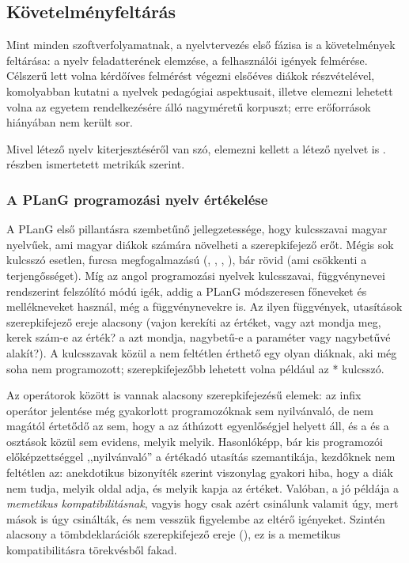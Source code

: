 
\subsection{Követelményfeltárás}

Mint minden szoftverfolyamatnak, a nyelvtervezés első fázisa is a követelmények feltárása: a nyelv feladatterének elemzése, a felhasználói igények felmérése.
Célszerű lett volna kérdőíves felmérést végezni elsőéves diákok részvételével, komolyabban kutatni a nyelvek pedagógiai aspektusait, illetve elemezni lehetett volna az egyetem rendelkezésére álló nagyméretű korpuszt; erre erőforrások hiányában nem került sor.

Mivel létező nyelv kiterjesztéséről van szó, elemezni kellett a létező nyelvet is . részben ismertetett metrikák szerint.

\subsubsection{A PLanG programozási nyelv értékelése}


A PLanG első pillantásra szembetűnő jellegzetessége, hogy kulcsszavai magyar nyelvűek, ami magyar diákok számára növelheti a szerepkifejező erőt.
Mégis sok kulcsszó esetlen, furcsa megfogalmazású (, , , ), bár rövid (ami csökkenti a terjengősséget).
Míg az angol programozási nyelvek kulcsszavai, függvénynevei rendszerint felszólító módú igék, addig a PLanG módszeresen főneveket és mellékneveket használ, még a függvénynevekre is.
Az ilyen függvények, utasítások szerepkifejező ereje alacsony (vajon  kerekíti az értéket, vagy azt mondja meg, kerek szám-e az érték? a  azt mondja, nagybetű-e a paraméter vagy nagybetűvé alakít?).
A kulcsszavak közül a  nem feltétlen érthető egy olyan diáknak, aki még soha nem programozott; szerepkifejezőbb lehetett volna például az * kulcsszó.

Az operátorok között is vannak alacsony szerepkifejezésű elemek: az  infix operátor jelentése még gyakorlott programozóknak sem nyilvánvaló, de nem magától értetődő az sem, hogy a \plang{/=} az áthúzott egyenlőségjel helyett áll, és a  és a \plang{/} osztások közül sem evidens, melyik melyik.
Hasonlóképp, bár kis programozói előképzettséggel ,,nyilvánvaló'' a \plang{:=} értékadó utasítás szemantikája, kezdőknek nem feltétlen az: anekdotikus bizonyíték szerint viszonylag gyakori hiba, hogy a diák nem tudja, melyik oldal adja, és melyik kapja az értéket.
Valóban, a \plang{:=} jó példája a \textit{memetikus kompatibilitásnak}, vagyis hogy csak azért csinálunk valamit úgy, mert mások is úgy csinálták, és nem vesszük figyelembe az eltérő igényeket\cite[6.1.5.2. rész]{McIver01}.
Szintén alacsony a tömbdeklarációk szerepkifejező ereje (), ez is a memetikus kompatibilitásra törekvésből fakad.

